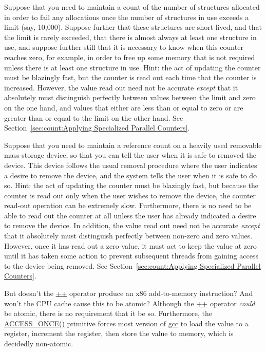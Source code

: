 \QuickQ{}
	Suppose that you need to maintain a count of the number of
	structures allocated in order to fail any allocations
	once the number of structures in use exceeds a limit
	(say, 10,000).
	Suppose further that these structures are short-lived,
	and that the limit is rarely exceeded, that there is almost
	always at least one structure in use, and suppose further
	still that it is necessary to know when this counter reaches
	zero, for example, in order to free up some memory
	that is not required unless there is at least one structure
	in use.
\QuickA{}
	Hint: the act of updating the counter must be blazingly
	fast, but the counter is read out each time that the
	counter is increased.
	However, the value read out need not be accurate
	\emph{except} that it absolutely must distinguish perfectly
	between values between the limit and zero on the one hand,
	and values that either are less than or equal to zero or
	are greater than or equal to the limit on the other hand.
	See Section~\ref{sec:count:Applying Specialized Parallel Counters}.

\QuickQ{}
	Suppose that you need to maintain a reference count on a
	heavily used removable mass-storage device, so that you
	can tell the user when it is safe to removed the device.
	This device follows the usual removal procedure where
	the user indicates a desire to remove the device, and
	the system tells the user when it is safe to do so.
\QuickA{}
	Hint: the act of updating the counter must be blazingly
	fast, but because the counter is read out only when the
	user wishes to remove the device, the counter read-out
	operation can be extremely slow.
	Furthermore, there is no need to be able to read out
	the counter at all unless the user has already indicated
	a desire to remove the device.
	In addition, the value read out need not be accurate
	\emph{except} that it absolutely must distinguish perfectly
	between non-zero and zero values.
	However, once it has read out a zero value, it must act
	to keep the value at zero until it has taken some action
	to prevent subsequent threads from gaining access to the
	device being removed.
	See Section~\ref{sec:count:Applying Specialized Parallel Counters}.

\QuickQ{}
	But doesn't the \url{++} operator produce an x86 add-to-memory
	instruction?
	And won't the CPU cache cause this to be atomic?
\QuickA{}
	Although the \url{++} operator \emph{could} be atomic, there
	is no requirement that it be so.
	Furthermore, the \url{ACCESS_ONCE()} primitive forces most
	version of \url{gcc} to load the value to a register, increment
	the register, then store the value to memory, which is
	decidedly non-atomic.

